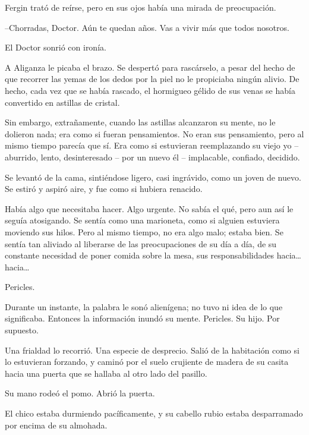 Fergin trató de reírse, pero en sus ojos había una mirada de preocupación.

--Chorradas, Doctor. Aún te quedan años. Vas a vivir más que todos nosotros.

El Doctor sonrió con ironía.



\mbox{}



\centerline{ \Huge *}



\mbox{}



A Aliganza le picaba el brazo. Se despertó para rascárselo, a pesar del hecho de que recorrer las yemas de los dedos por la piel no le propiciaba ningún alivio. De hecho, cada vez que se había rascado, el hormigueo gélido de sus venas se había convertido en astillas de cristal.

Sin embargo, extrañamente, cuando las astillas alcanzaron su mente, no le dolieron nada; era como si fueran pensamientos. No eran sus pensamiento, pero al mismo tiempo parecía que sí. Era como si estuvieran reemplazando su viejo yo – aburrido, lento, desinteresado – por un nuevo él – implacable, confiado, decidido.

Se levantó de la cama, sintiéndose ligero, casi ingrávido, como un joven de nuevo. Se estiró y aspiró aire, y fue como si hubiera renacido.

Había algo que necesitaba hacer. Algo urgente. No sabía el qué, pero aun así le seguía atosigando. Se sentía como una marioneta, como si alguien estuviera moviendo sus hilos. Pero al mismo tiempo, no era algo malo; estaba bien. Se sentía tan aliviado al liberarse de las preocupaciones de su día a día, de su constante necesidad de poner comida sobre la mesa, sus responsabilidades hacia… hacia…

Pericles.

Durante un instante, la palabra le sonó alienígena; no tuvo ni idea de lo que significaba. Entonces la información inundó su mente. Pericles. Su hijo. Por supuesto.

Una frialdad lo recorrió. Una especie de desprecio. Salió de la habitación como si lo estuvieran forzando, y caminó por el suelo crujiente de madera de su casita hacia una puerta que se hallaba al otro lado del pasillo.

Su mano rodeó el pomo. Abrió la puerta.

El chico estaba durmiendo pacíficamente, y su cabello rubio estaba desparramado por encima de su almohada.

